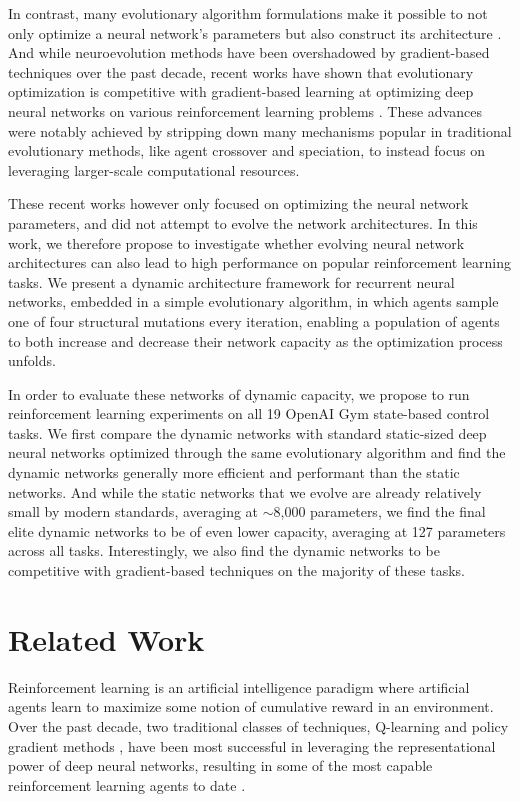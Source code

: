 \documentclass{article} %
\begin{document}
In contrast, many evolutionary algorithm formulations make it possible to not only optimize a neural network's parameters but also construct its architecture \citep{stanley2019designing}. And while neuroevolution methods have been overshadowed by gradient-based techniques over the past decade, recent works have shown that evolutionary optimization is competitive with gradient-based learning at optimizing deep neural networks on various reinforcement learning problems \citep{salimans2017evolution,such2017deep,risi2019deep}. These advances were notably achieved by stripping down many mechanisms popular in traditional evolutionary methods, like agent crossover and speciation, to instead focus on leveraging larger-scale computational resources. 

These recent works however only focused on optimizing the neural network parameters, and did not attempt to evolve the network architectures. In this work, we therefore propose to investigate whether evolving neural network architectures can also lead to high performance on popular reinforcement learning tasks. We present a dynamic architecture framework for recurrent neural networks, embedded in a simple evolutionary algorithm, in which agents sample one of four structural mutations every iteration, enabling a population of agents to both increase and decrease their network capacity as the optimization process unfolds.

In order to evaluate these networks of dynamic capacity, we propose to run reinforcement learning experiments on all 19 \mbox{OpenAI} Gym \citep{brockman2016openai} state-based control tasks. We first compare the dynamic networks with standard static-sized deep neural networks optimized through the same evolutionary algorithm and find the dynamic networks generally more efficient and performant than the static networks. And while the static networks that we evolve are already relatively small by modern standards, averaging at $\sim$8,000 parameters, we find the final elite dynamic networks to be of even lower capacity, averaging at 127 parameters across all tasks. Interestingly, we also find the dynamic networks to be competitive with gradient-based techniques on the majority of these tasks.
\vspace{-1em}
\section{Related Work}
\vspace{-1em}
Reinforcement learning \citep{sutton2018reinforcement} is an artificial intelligence paradigm where artificial agents learn to maximize some notion of cumulative reward in an environment. Over the past decade, two traditional classes of techniques, Q-learning \citep{watkins1992q} and policy gradient methods \citep{sutton2000policy}, have been most successful in leveraging the representational power of deep neural networks, resulting in some of the most capable reinforcement learning agents to date \citep{mnih2013playing, lillicrap2015continuous, mnih2016asynchronous, schulman2017proximal, dabney2018distributional, haarnoja2018soft, fujimoto2018addressing, wang2020truly, kuznetsov2020controlling}.  
\end{document}

